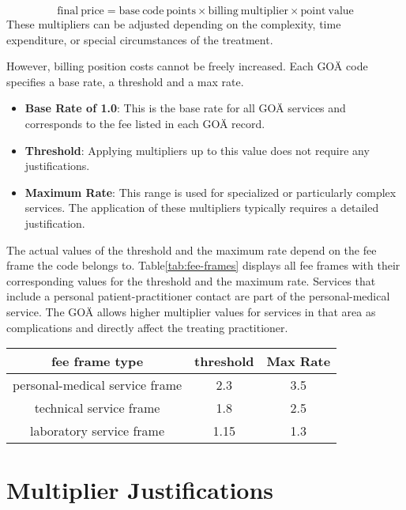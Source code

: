 \[
    \mathrm{final\ price} = \mathrm{base\ code\ points} \times \mathrm{billing\ multiplier} \times \mathrm{point\ value}
\]
These multipliers can be adjusted depending on the complexity, time expenditure, or special circumstances of the treatment.

However, billing position costs cannot be freely increased.
Each GOÄ code specifies a base rate, a threshold and a max rate\cite[]{bruck1998kommentar}.

\begin{itemize}
    \item \textbf{Base Rate of 1.0}: This is the base rate for all GOÄ services and corresponds to the fee listed in each GOÄ record.
    \item \textbf{Threshold}: Applying multipliers up to this value does not require any justifications.
    \item \textbf{Maximum Rate}: This range is used for specialized or particularly complex services.
    The application of these multipliers typically requires a detailed justification.
\end{itemize}

The actual values of the threshold and the maximum rate depend on the fee frame the code belongs to.
Table\ref{tab:fee-frames} displays all fee frames with their corresponding values for the threshold and the maximum rate\cite{hermanns2013bemessung}.
Services that include a personal patient-practitioner contact are part of the personal-medical service.
The GOÄ allows higher multiplier values for services in that area as complications and directly affect the treating practitioner.


\begin{center}
    \begin{tabular}{ |c|c|c| }\label{tab:fee-frames}
        \hline
        fee frame type & threshold & Max Rate \\
        \hline
        personal-medical service frame & 2.3 & 3.5 \\
        technical service frame & 1.8 & 2.5 \\
        laboratory service frame & 1.15 & 1.3 \\
        \hline
    \end{tabular}
\end{center}

\section{Multiplier Justifications}\label{sec:multiplier-justifications}


